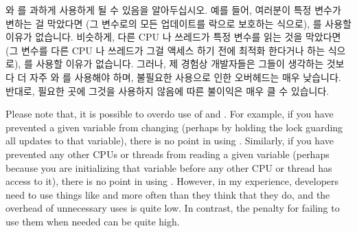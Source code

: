  와  를 과하게 사용하게 될 수 있음을
알아두십시오.
예를 들어, 여러분이 특정 변수가 변하는 걸 막았다면 (그 변수로의 모든 업데이트를
락으로 보호하는 식으로),  를 사용할 이유가 없습니다.
비슷하게, 다른 CPU 나 쓰레드가 특정 변수를 읽는 것을 막았다면 (그 변수를 다른
CPU 나 쓰레드가 그걸 액세스 하기 전에 최적화 한다거나 하는 식으로),
 를 사용할 이유가 없습니다.
그러나, 제 경험상 개발자들은 그들이 생각하는 것보다 더 자주  와
 를 사용해야 하며, 불필요한 사용으로 인한 오버헤드는 매우
낮습니다.
반대로, 필요한 곳에 그것을 사용하지 않음에 따른 불이익은 매우 클 수 있습니다.

\iffalse

Please note that, it is possible to overdo use of  and
.
For example, if you have prevented a given variable from changing
(perhaps by holding the lock guarding all updates to that
variable), there is no point in using .
Similarly, if you have prevented any other CPUs or threads from
reading a given variable (perhaps because you are initializing
that variable before any other CPU or thread has access to it),
there is no point in using .
However, in my experience, developers need to use things like
 and  more often than they think that
they do, and the overhead of unnecessary uses is quite low.
In contrast, the penalty for failing to use them when needed can be quite high.

